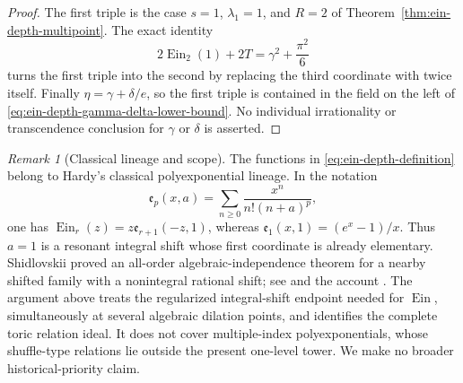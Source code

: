 \documentclass[11pt]{article}
\theoremstyle{definition}
\theoremstyle{remark}
\newtheorem{remark}[theorem]{Remark}
\newcommand{\Ein}{\operatorname{Ein}}
\newcommand{\EinDepth}[1]{\operatorname{Ein}_{#1}}
\begin{document}
\begin{proof}
The first triple is the case \(s=1\), \(\lambda_1=1\), and \(R=2\) of
Theorem~\ref{thm:ein-depth-multipoint}.  The exact identity
\[
 2\EinDepth{2}(1)+2T=\gamma^2+\frac{\pi^2}{6}
\]
turns the first triple into the second by replacing the third coordinate
with twice itself.  Finally
\(\eta=\gamma+\delta/e\), so the first triple is contained in the field
on the left of \eqref{eq:ein-depth-gamma-delta-lower-bound}.
No individual irrationality or transcendence conclusion for \(\gamma\)
or \(\delta\) is asserted.
\end{proof}

\begin{remark}[Classical lineage and scope]
The functions in \eqref{eq:ein-depth-definition} belong to Hardy's
classical polyexponential lineage.  In the notation
\[
 \mathfrak e_p(x,a)=\sum_{n\geq0}\frac{x^n}{n!(n+a)^p},
\]
one has
\(\EinDepth{r}(z)=z\mathfrak e_{r+1}(-z,1)\), whereas
\(\mathfrak e_1(x,1)=(e^x-1)/x\).  Thus \(a=1\) is a resonant integral
shift whose first coordinate is already elementary.  Shidlovskii proved an all-order
algebraic-independence theorem for a nearby shifted family with a
nonintegral rational shift; see \cite[Sec.~7.3.3]{Shidlovskii1989} and the
account \cite[Sec.~9]{Boyadzhiev2007}.  The argument above treats the
regularized integral-shift endpoint needed for \(\Ein\), simultaneously at
several algebraic dilation points, and identifies the complete toric
relation ideal.
It does not cover multiple-index polyexponentials, whose shuffle-type
relations lie outside the present one-level tower.  We make no broader
historical-priority claim.
\end{remark}
\end{document}
